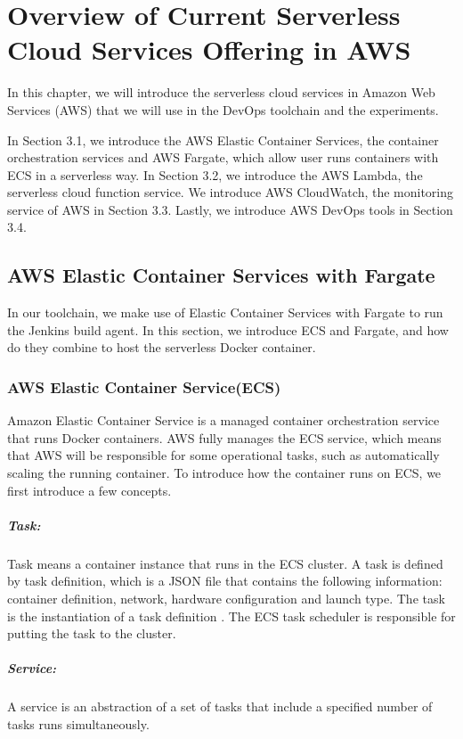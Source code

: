 \chapter{Overview of Current Serverless Cloud Services Offering in AWS}
In this chapter, we will introduce the serverless cloud services in Amazon Web Services (AWS) that we will use in the DevOps toolchain and the experiments.
\par
In Section 3.1, we introduce the AWS Elastic Container Services, the container orchestration services and AWS Fargate, which allow user runs containers with ECS in a serverless way. In Section 3.2, we introduce the AWS Lambda, the serverless cloud function service. We introduce AWS CloudWatch, the monitoring service of AWS in Section 3.3. Lastly, we introduce AWS DevOps tools in Section 3.4.
\section{AWS Elastic Container Services with Fargate}
In our toolchain, we make use of Elastic Container Services with Fargate to run the Jenkins build agent. In this section, we introduce ECS and Fargate, and how do they combine to host the serverless Docker container.
\subsection{AWS Elastic Container Service(ECS)}
Amazon Elastic Container Service is a managed container orchestration service that runs Docker containers. AWS fully manages the ECS service, which means that AWS will be responsible for some operational tasks, such as automatically scaling the running container. To introduce how the container runs on ECS, we first introduce a few concepts.
\paragraph{Task:} Task means a container instance that runs in the ECS cluster. A task is defined by task definition, which is a JSON file that contains the following information: container definition, network, hardware configuration and launch type. The task is the instantiation of a task definition \cite{WhatisAm71:online}. The ECS task scheduler is responsible for putting the task to the cluster. 
\paragraph{Service:} A service is an abstraction of a set of tasks that include a specified number of tasks runs simultaneously.
